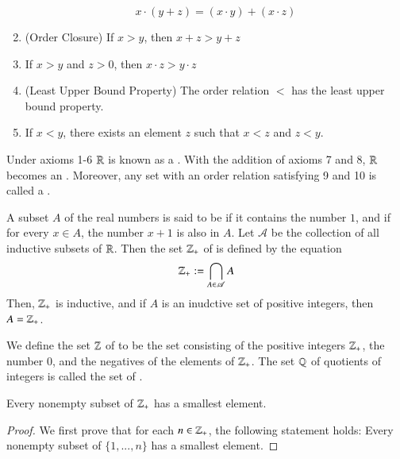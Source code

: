 \documentclass[12pt, a4paper, oneside, openright, titlepage]{book}
\begin{document}
\begin{appendices}
\begin{construction}
\begin{enumerate}
\begin{equation}
                    x\cdot (y+z) = (x\cdot y) + (x\cdot z)
                \end{equation}
            \item (Order Closure) If $x > y$, then $x+z > y+z$
            \item If $x > y$ and $z > 0$, then $x\cdot z > y\cdot z$
            \item (Least Upper Bound Property) The order relation $<$ has the least upper bound property.
            \item If $x < y$, there exists an element $z$ such that $x < z$ and $z < y$.
        \end{enumerate}
        Under axioms 1-6 $\mathbb R$ is known as a . With the addition of axioms 7 and 8, $\mathbb R$ becomes an . Moreover, any set with an order relation satisfying 9 and 10 is called a .
    \end{construction}

    \begin{definition}
        A subset $A$ of the real numbers is said to be  if it contains the number $1$, and if for every $x \in A$, the number $x+1$ is also in $A$. Let $\mathscr{A}$ be the collection of all inductive subsets of $\mathbb R$. Then the set $\mathbb Z_{+}$ of  is defined by the equation \begin{equation}
            \mathbb Z_+ := \bigcap\limits_{A\in\mathscr{A}}A
        \end{equation}
        Then, $\mathbb Z_+$ is inductive, and if $A$ is an inudctive set of positive integers, then $A = \mathbb Z_+$.
    \end{definition}

    \begin{definition}[Integers]
        We define the set $\mathbb Z$ of  to be the set consisting of the positive integers $\mathbb Z_+$, the number $0$, and the negatives of the elements of $\mathbb Z_+$. The set $\mathbb Q$ of quotients of integers is called the set of .
    \end{definition}

    \begin{theorem}
        Every nonempty subset of $\mathbb Z_+$ has a smallest element.
    \end{theorem}
    \begin{proof}
        We first prove that for each $n \in \mathbb Z_+$, the following statement holds: Every nonempty subset of $\{1,...,n\}$ has a smallest element.


\end{proof}
\end{appendices}
\end{document}
